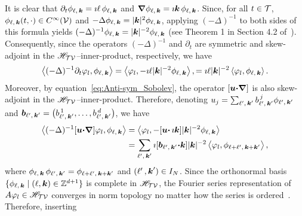 \documentclass[amsa]{ipart}
\begin{document}
It is clear that
$\partial_t\phi_{\ell,\,\boldsymbol{k}}=\imath\ell\,\phi_{\ell,\,\boldsymbol{k}}$ and
$\mbox{\boldmath${\nabla}$}\phi_{\ell,\,\boldsymbol{k}}=\imath\boldsymbol{k}\,\phi_{\ell,\,\boldsymbol{k}}$. Since, for all $t\in\mathcal{T}$,
$\phi_{\ell,\,\boldsymbol{k}}(t,\cdot)\in C^\infty(\mathcal{V})$ and 
$-\Delta\phi_{\ell,\,\boldsymbol{k}}=|\boldsymbol{k}|^2\phi_{\ell,\,\boldsymbol{k}}$, applying $(-\Delta)^{-1}$ to both
sides of this formula yields
$(-\Delta)^{-1}\phi_{\ell,\,\boldsymbol{k}}=|\boldsymbol{k}|^{-2}\phi_{\ell,\,\boldsymbol{k}}$ (see Theorem 1 in
Section 4.2 of~\cite{McOwen:2003:PDE}). Consequently, since the
operators $(-\Delta)^{-1}$ and $\partial_t$ are symmetric and skew-adjoint in the
$\mathscr{H}_{\mathcal{T}\mathcal{V}}$--inner-product, respectively, we have
%
\begin{align}\label{eq:Fourier_Del_Dt}
  \left\langle(-\Delta)^{-1}\partial_t\varphi_l,\phi_{\ell,\,\veck}\right\rangle
  =\left\langle\varphi_l,-\imath\ell|\veck|^{-2}\phi_{\ell,\,\veck}\right\rangle,
  =\imath\ell|\veck|^{-2}\left\langle\varphi_l,\phi_{\ell,\,\veck}\right\rangle.
\end{align}
%
Moreover, by equation~\eqref{eq:Anti-sym_Sobolev}, the operator
$[\boldsymbol{u}\mbox{\boldmath${\cdot}$}\mbox{\boldmath${\nabla}$}]$ is also skew-adjoint in the
$\mathscr{H}_{\mathcal{T}\mathcal{V}}$--inner-product. Therefore, denoting
$u_j=\sum_{\ell^\prime,\,\boldsymbol{k}^\prime}b^{\,j}_{\ell^\prime,\,\boldsymbol{k}^\prime}\phi_{\ell^\prime,\,\boldsymbol{k}^\prime}$ and
$\boldsymbol{b}_{\ell^\prime,\,\boldsymbol{k}^\prime}=\big(b^{\,1}_{\ell^\prime,\,\boldsymbol{k}^\prime},\ldots,b^{\,d}_{\ell^\prime,\,\boldsymbol{k}^\prime}\big)$,
we have 
%
\begin{align}\label{eq:Fourier_Del_u_grad}   
  \left\langle(-\Delta)^{-1}[\vecu\bcdot\bnabla]\varphi_l,\phi_{\ell,\,\veck}\right\rangle
  &=\left\langle\varphi_l,-[\vecu\bcdot\,\imath\veck]|\veck|^{-2}\phi_{\ell,\,\veck}\right\rangle
  \\\notag
  &=\sum_{\ell^\prime,\,\veck^\prime}
  \imath[\vecb_{\ell^\prime,\,\veck^\prime}\bcdot\veck]|\veck|^{-2}
  \left\langle\varphi_l,\phi_{\ell+\ell^\prime,\,\veck+\veck^\prime}\right\rangle,
\end{align}
%
where $\phi_{\ell,\,\boldsymbol{k}}\,\phi_{\ell^\prime,\,\boldsymbol{k}^\prime}=\phi_{\ell+\ell^\prime,\,\boldsymbol{k}+\boldsymbol{k}^\prime}$ and
$(\ell^\prime\,,\boldsymbol{k}^\prime)\in I_N$. Since the orthonormal basis
$\{\phi_{\ell,\,\boldsymbol{k}} \;|\; (\ell,\boldsymbol{k})\in\mathbb{Z}^{d+1}\}$ is complete
in $\mathscr{H}_{\mathcal{T}\mathcal{V}}$, the Fourier series representation of 
$A\varphi_l\in\mathscr{H}_{\mathcal{T}\mathcal{V}}$ converges in norm topology no matter how the
series is ordered~\cite{Folland:99:RealAnalysis}. Therefore, inserting 
\end{document}
